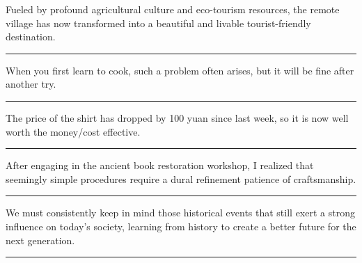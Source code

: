 \documentclass[11pt,a4paper]{article}
\newcommand{\num}[1]{\makebox[1.9em][r]{#1.}\hspace{0.3em}}
\newcommand{\wline}{\noindent\rule{\linewidth}{0.4pt}}
\begin{document}
\begin{minipage}{\linewidth}

\num{14}Fueled by profound agricultural culture and eco-tourism resources, the remote village has now transformed into a beautiful and livable tourist-friendly destination.

\vspace{0.25em}

\wline

\end{minipage}

\vspace{0.35em}\vspace{0.15em}

\begin{minipage}{\linewidth}

\num{15}When you first learn to cook, such a problem often arises, but it will be fine after another try.

\vspace{0.25em}

\wline

\end{minipage}

\begin{minipage}{\linewidth}

\num{16}The price of the shirt has dropped by 100 yuan since last week, so it is now well worth the money/cost effective.

\vspace{0.25em}

\wline

\end{minipage}

\begin{minipage}{\linewidth}

\num{17}After engaging in the ancient book restoration workshop, I realized that seemingly simple procedures require a dural refinement patience of craftsmanship.

\vspace{0.25em}

\wline

\end{minipage}

\begin{minipage}{\linewidth}

\num{18}We must consistently keep in mind those historical events that still exert a strong influence on today’s society, learning from history to create a better future for the next generation.

\vspace{0.25em}

\wline

\end{minipage}
\end{document}
